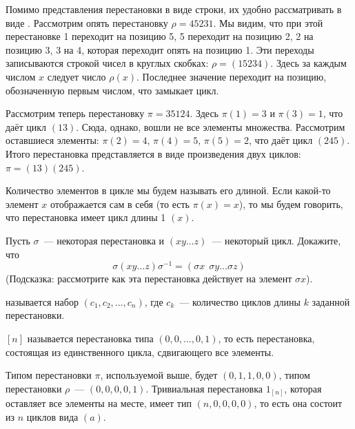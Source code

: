 Помимо представления перестановки в виде строки, их удобно рассматривать в виде . Рассмотрим опять перестановку $\rho = 45231$. Мы видим, что при этой перестановке 1 переходит на позицию 5, 5 переходит на позицию 2, 2 на позицию 3, 3 на 4, которая переходит опять на позицию 1. Эти переходы записываются строкой чисел в круглых скобках: $\rho = (15234)$. Здесь за каждым числом $x$ следует число $\rho(x)$. Последнее значение переходит на позицию, обозначенную первым числом, что замыкает цикл.

Рассмотрим теперь перестановку $\pi = 35124$. Здесь $\pi(1) = 3$ и $\pi(3) = 1$, что даёт цикл $(13)$. Сюда, однако, вошли не все элементы множества. Рассмотрим оставшиеся элементы: $\pi(2) = 4$, $\pi(4) = 5$, $\pi(5) = 2$, что даёт цикл $(245)$. Итого перестановка представляется в виде произведения двух циклов: $\pi = (13)(245)$.

Количество элементов в цикле мы будем называть его длиной. Если какой-то элемент $x$ отображается сам в себя (то есть $\pi(x) = x$), то мы будем говорить, что перестановка имеет цикл длины 1 $(x)$.

\begin{exercise}
Пусть $\sigma$~--- некоторая перестановка и $(x y \ldots z)$~--- некоторый цикл. Докажите, что
$$\sigma(x y \ldots z)\sigma^{-1} = (\sigma x \:\: \sigma y \ldots \sigma z)$$
(Подсказка: рассмотрите как эта перестановка действует на элемент $\sigma x$).
\end{exercise}

\begin{definition}
 называется набор $(c_1, c_2, \ldots, c_n)$, где $c_k$~--- количество циклов длины $k$ заданной перестановки.
\end{definition}

\begin{definition}
 $[n]$ называется перестановка типа $(0, 0, \ldots, 0, 1)$, то есть перестановка, состоящая из единственного цикла, сдвигающего все элементы.
\end{definition}

\begin{example}
Типом перестановки $\pi$, используемой выше, будет $(0, 1, 1, 0, 0)$, типом перестановки $\rho$~--- $(0, 0, 0, 0, 1)$. Тривиальная перестановка $1_{[n]}$, которая оставляет все элементы на месте, имеет тип $(n, 0, 0, 0, 0)$, то есть она состоит из $n$ циклов вида $(a)$.
\end{example}

